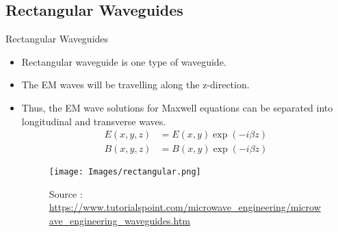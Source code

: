 \documentclass[12pt, dvipsnames]{beamer}
\begin{document}
\subsection{Rectangular Waveguides}
\begin{frame}{Rectangular Waveguides}
    \begin{itemize}
        \item Rectangular waveguide is one type of waveguide.
        \item The EM waves will be travelling along the z-direction.
        \item Thus, the EM wave solutions for Maxwell equations can be separated into longitudinal and transverse waves.
        \begin{align*}
            E(x,y,z)&=E(x,y)\exp(-i\beta z) \\
            B(x,y,z)&=B(x,y)\exp(-i\beta z)
        \end{align*}
        \begin{figure}
            \centering
            \texttt{[image: Images/rectangular.png]}
            \caption{\tiny{Source : \url{https://www.tutorialspoint.com/microwave_engineering/microwave_engineering_waveguides.htm}}}
        \end{figure}
    \end{itemize}
\end{frame}
\end{document}

